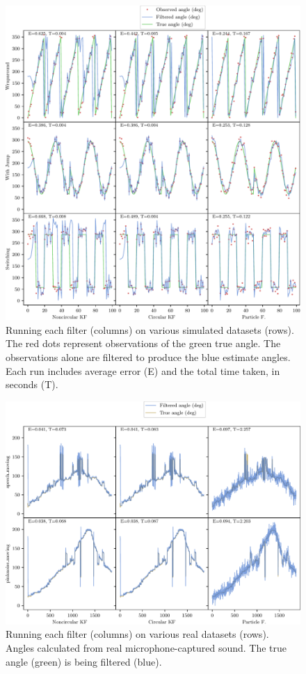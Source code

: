 \documentclass[11pt]{amsart}
\begin{document}
\begin{figure}[htp]
    \centering
    \includegraphics[width=.95\textwidth]{actual_paper_graphs/all_simulated.pdf}\hfill
    \caption{
        Running each filter (columns) on various simulated datasets (rows).
        The red dots represent observations of the green true angle. 
        The observations alone are filtered to produce the blue estimate angles.
        Each run includes average error (E) and the total time taken, in seconds (T).
        }
    \label{fig:all_simulated}
\end{figure}

\begin{figure}[htp]
    \centering
    \includegraphics[width=.75\textwidth]{actual_paper_graphs/all_real.pdf}\hfill
    \caption{Running each filter (columns) on various real datasets (rows). Angles calculated from real microphone-captured sound. The true angle (green) is being filtered (blue).}
    \label{fig:all_real}
\end{figure}
\end{document}
